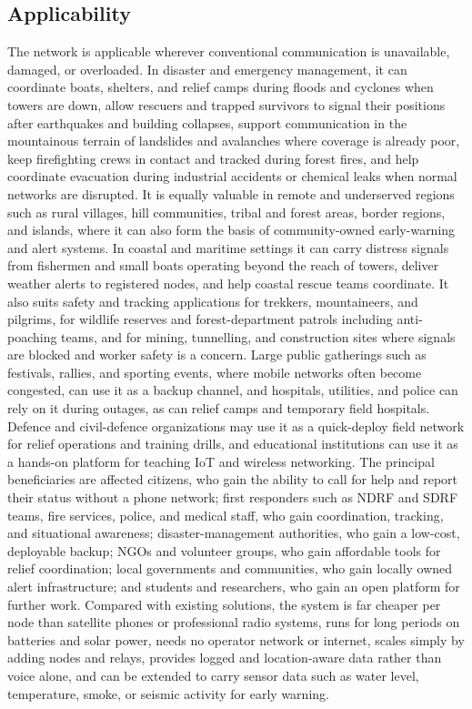 \subsection{Applicability}
The network is applicable wherever conventional communication is unavailable, damaged, or overloaded. In disaster and emergency management, it can coordinate boats, shelters, and relief camps during floods and cyclones when towers are down, allow rescuers and trapped survivors to signal their positions after earthquakes and building collapses, support communication in the mountainous terrain of landslides and avalanches where coverage is already poor, keep firefighting crews in contact and tracked during forest fires, and help coordinate evacuation during industrial accidents or chemical leaks when normal networks are disrupted. It is equally valuable in remote and underserved regions such as rural villages, hill communities, tribal and forest areas, border regions, and islands, where it can also form the basis of community-owned early-warning and alert systems. In coastal and maritime settings it can carry distress signals from fishermen and small boats operating beyond the reach of towers, deliver weather alerts to registered nodes, and help coastal rescue teams coordinate. It also suits safety and tracking applications for trekkers, mountaineers, and pilgrims, for wildlife reserves and forest-department patrols including anti-poaching teams, and for mining, tunnelling, and construction sites where signals are blocked and worker safety is a concern. Large public gatherings such as festivals, rallies, and sporting events, where mobile networks often become congested, can use it as a backup channel, and hospitals, utilities, and police can rely on it during outages, as can relief camps and temporary field hospitals. Defence and civil-defence organizations may use it as a quick-deploy field network for relief operations and training drills, and educational institutions can use it as a hands-on platform for teaching IoT and wireless networking. The principal beneficiaries are affected citizens, who gain the ability to call for help and report their status without a phone network; first responders such as NDRF and SDRF teams, fire services, police, and medical staff, who gain coordination, tracking, and situational awareness; disaster-management authorities, who gain a low-cost, deployable backup; NGOs and volunteer groups, who gain affordable tools for relief coordination; local governments and communities, who gain locally owned alert infrastructure; and students and researchers, who gain an open platform for further work. Compared with existing solutions, the system is far cheaper per node than satellite phones or professional radio systems, runs for long periods on batteries and solar power, needs no operator network or internet, scales simply by adding nodes and relays, provides logged and location-aware data rather than voice alone, and can be extended to carry sensor data such as water level, temperature, smoke, or seismic activity for early warning.
